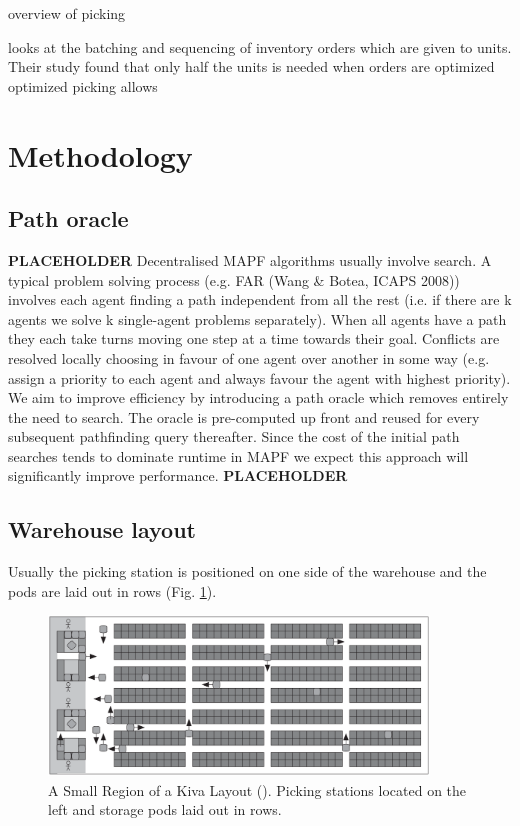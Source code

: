 \documentclass[a4paper,11pt]{article}
\begin{document}

\cite{de2007design} overview of picking

\cite{boysen2017parts} looks at the batching and sequencing of inventory orders which are given to units. Their study found that only half the units is needed when orders are optimized optimized picking allows

\section{Methodology}
\label{Research}
\subsection{Path oracle}

\cite{strasser2015compressing}


\noindent \textbf{PLACEHOLDER} Decentralised MAPF algorithms usually involve search. A typical problem solving process (e.g. FAR (Wang \& Botea, ICAPS 2008)) involves each agent finding a path independent from all the rest (i.e. if there are k agents we solve k single-agent problems separately). When all agents have a path they each take turns moving one step at a time towards their goal. Conflicts are resolved locally choosing in favour of one agent over another in some way (e.g. assign a priority to each agent and always favour the agent with highest priority). We aim to improve efficiency by introducing a path oracle which removes entirely the need to search. The oracle is pre-computed up front and reused for every subsequent pathfinding query thereafter. Since the cost of the initial path searches tends to dominate runtime in MAPF we expect this approach will significantly improve performance. \textbf{PLACEHOLDER}

\subsection{Warehouse layout}
Usually the picking station is positioned on one side of the warehouse and the pods are laid out in rows (Fig. \ref{kivalayout1}).

\begin{figure}[h]
	\centering
	\includegraphics[width=0.9\textwidth]{graphics/kivasystemlayout}
	\caption{A Small Region of a Kiva Layout (\cite{wurman2008coordinating}). Picking stations located on the left and storage pods laid out in rows.}
	\label{kivalayout1}
\end{figure}
\end{document}
